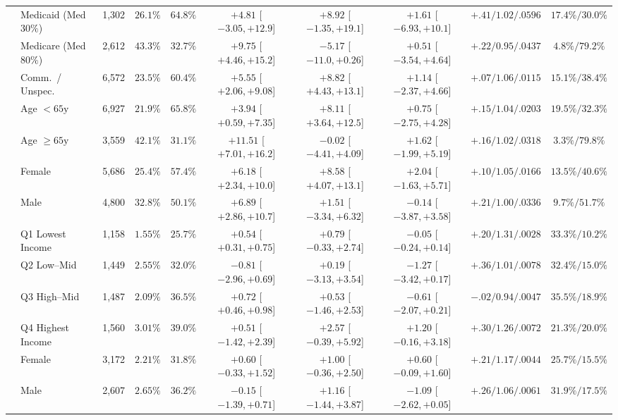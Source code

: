 \documentclass[11pt]{article}
\theoremstyle{remark}
\begin{document}
\begin{table}[h!]
{\begin{tabular}{llrrrccccc}
  & Medicaid (Med $30\%$) & 1,302 & $26.1\%$ & $64.8\%$ & $+4.81$ [$-3.05,+12.9$] & $+8.92$ [$-1.35,+19.1$] & $+1.61$ [$-6.93,+10.1$] & $+.41 / 1.02 / .0596$ & $17.4\% / 30.0\%$ \\
  & Medicare (Med $80\%$) & 2,612 & $43.3\%$ & $32.7\%$ & $+9.75$ [$+4.46,+15.2$] & $-5.17$ [$-11.0,+0.26$] & $+0.51$ [$-3.54,+4.64$] & $+.22 / 0.95 / .0437$ & $4.8\% / 79.2\%$ \\
  & Comm.\ / Unspec. & 6,572 & $23.5\%$ & $60.4\%$ & $+5.55$ [$+2.06,+9.08$] & $+8.82$ [$+4.43,+13.1$] & $+1.14$ [$-2.37,+4.66$] & $+.07 / 1.06 / .0115$ & $15.1\% / 38.4\%$ \\
  & Age $<65\text{y}$ & 6,927 & $21.9\%$ & $65.8\%$ & $+3.94$ [$+0.59,+7.35$] & $+8.11$ [$+3.64,+12.5$] & $+0.75$ [$-2.75,+4.28$] & $+.15 / 1.04 / .0203$ & $19.5\% / 32.3\%$ \\
  & Age $\ge 65\text{y}$ & 3,559 & $42.1\%$ & $31.1\%$ & $+11.51$ [$+7.01,+16.2$] & $-0.02$ [$-4.41,+4.09$] & $+1.62$ [$-1.99,+5.19$] & $+.16 / 1.02 / .0318$ & $3.3\% / 79.8\%$ \\
  & Female & 5,686 & $25.4\%$ & $57.4\%$ & $+6.18$ [$+2.34,+10.0$] & $+8.58$ [$+4.07,+13.1$] & $+2.04$ [$-1.63,+5.71$] & $+.10 / 1.05 / .0166$ & $13.5\% / 40.6\%$ \\
  & Male & 4,800 & $32.8\%$ & $50.1\%$ & $+6.89$ [$+2.86,+10.7$] & $+1.51$ [$-3.34,+6.32$] & $-0.14$ [$-3.87,+3.58$] & $+.21 / 1.00 / .0336$ & $9.7\% / 51.7\%$ \\
\midrule
{}
  & Q1 Lowest Income & 1,158 & $1.55\%$ & $25.7\%$ & $+0.54$ [$+0.31,+0.75$] & $+0.79$ [$-0.33,+2.74$] & $-0.05$ [$-0.24,+0.14$] & $+.20 / 1.31 / .0028$ & $33.3\% / 10.2\%$ \\
  & Q2 Low--Mid & 1,449 & $2.55\%$ & $32.0\%$ & $-0.81$ [$-2.96,+0.69$] & $+0.19$ [$-3.13,+3.54$] & $-1.27$ [$-3.42,+0.17$] & $+.36 / 1.01 / .0078$ & $32.4\% / 15.0\%$ \\
  & Q3 High--Mid & 1,487 & $2.09\%$ & $36.5\%$ & $+0.72$ [$+0.46,+0.98$] & $+0.53$ [$-1.46,+2.53$] & $-0.61$ [$-2.07,+0.21$] & $-.02 / 0.94 / .0047$ & $35.5\% / 18.9\%$ \\
  & Q4 Highest Income & 1,560 & $3.01\%$ & $39.0\%$ & $+0.51$ [$-1.42,+2.39$] & $+2.57$ [$-0.39,+5.92$] & $+1.20$ [$-0.16,+3.18$] & $+.30 / 1.26 / .0072$ & $21.3\% / 20.0\%$ \\
  & Female & 3,172 & $2.21\%$ & $31.8\%$ & $+0.60$ [$-0.33,+1.52$] & $+1.00$ [$-0.36,+2.50$] & $+0.60$ [$-0.09,+1.60$] & $+.21 / 1.17 / .0044$ & $25.7\% / 15.5\%$ \\
  & Male & 2,607 & $2.65\%$ & $36.2\%$ & $-0.15$ [$-1.39,+0.71$] & $+1.16$ [$-1.44,+3.87$] & $-1.09$ [$-2.62,+0.05$] & $+.26 / 1.06 / .0061$ & $31.9\% / 17.5\%$ \\
\bottomrule
\end{tabular}%
}
\end{table}
\end{document}
